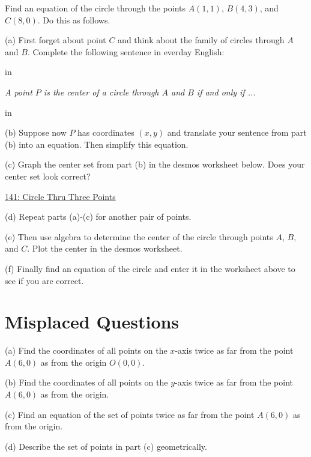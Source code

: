 \documentclass{ximera}
\newcommand{\pskip}{\vskip 0.1 in}
\begin{document}
\begin{question}  \label{Q:Erer3r3r3r}
Find an equation of the circle through the points $A(1,1)$, $B(4,3)$, and $C(8,0)$. Do this as follows.

(a) First forget about point $C$ and think about the family of circles through $A$ and $B$. Complete the following sentence in everday English:

\pskip

\emph{A point $P$ is the center of a circle through $A$ and $B$ if and only if ...}

\pskip

(b) Suppose now $P$ has coordinates $(x,y)$ and translate your sentence from part (b) into an equation. Then simplify this equation.

(c) Graph the center set from part (b) in the desmos worksheet below. Does your center set look correct?

\begin{onlineOnly}
    \begin{center}
\end{center}
\end{onlineOnly}


\href{https://www.desmos.com/calculator/oatvcruval}{141: Circle Thru Three Points}


(d) Repeat parts (a)-(c) for another pair of points.

(e) Then use algebra to determine the center of the circle through points $A$, $B$, and $C$. Plot the center in the desmos worksheet.

(f) Finally find an equation of the circle and enter it in the worksheet above to see if you are correct.
\end{question}


\section*{Misplaced Questions}  
\begin{question}  \label{Q:POer3r3r3r3r}
(a) Find the coordinates of all  points on the $x$-axis twice as far from the point $A(6,0)$ as from the origin $O(0,0)$.

(b) Find the coordinates of all  points on the $y$-axis twice as far from the point $A(6,0)$ as from the origin.

(c) Find an equation of the set of points twice as far from the point $A(6,0)$ as from the origin.

(d) Describe the set of points in part (c) geometrically.
\end{question}
\end{document}
